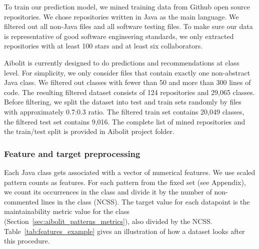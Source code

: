 \label{sec:dataset}

To train our prediction model, we mined training data
from Github open source repositories. We chose repositories written in Java
as the main language. We filtered out all non-Java files and all software
testing files. To make sure our data is
representative of good software engineering standards, we only extracted
repositories with at least 100 stars and at least six collaborators.

Aibolit is currently designed to do predictions and recommendations at class
level. For simplicity, we only consider files that contain exactly one
non-abstract Java class.
We filtered out classes with fewer than 50 and more than 300 lines of code.
The resulting filtered dataset consists of 124 repositories and
29,065 classes. Before filtering, we split the dataset into test and train sets randomly by files with
approximately 0.7:0.3 ratio. The filtered train set contains 20,049 classes,
the filtered test set contains 9,016.
The complete list of mined repositories and the train/test split is provided in Aibolit
project folder.

\subsubsection*{Feature and target preprocessing}

Each Java class gets
associated with a vector of numerical features. We use scaled pattern counts as
features. For each pattern from the fixed set
(see Appendix), we count its occurrences in the
class and divide it by the number of non-commented lines in the class (NCSS).
The target value for each datapoint is the maintainability metric value for the
class (Section~\ref{sec:aibolit_patterns_metrics}), also divided by the NCSS.
Table~\ref{tab:features_example}
gives an illustration of how a dataset looks after this procedure.


%
%


